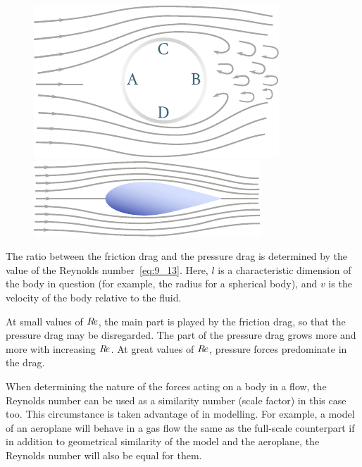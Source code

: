 \begin{figure}[t]
	\begin{minipage}[t]{0.5\linewidth}
		\begin{center}
			\includegraphics[scale=1.0]{figures/ch_09/fig_9_16.pdf}
			\caption[]{}
			\label{fig:9_16}
		\end{center}
	\end{minipage}
	\hspace{-0.0cm}
	\begin{minipage}[t]{0.5\linewidth}
		\begin{center}
			\includegraphics[scale=1.0]{figures/ch_09/fig_9_17.pdf}
			\caption[]{}
			\label{fig:9_17}
		\end{center}
	\end{minipage}
	\vspace{-0.5cm}
\end{figure}

The ratio between the friction drag and the pressure drag is determined by the value of the Reynolds number~\eqref{eq:9_13}. Here, $l$ is a characteristic dimension of the body in question (for example, the radius for a spherical body), and $v$ is the velocity of the body relative to the fluid.

At small values of $R\hspace{-1pt}e$, the main part is played by the friction drag, so that the pressure drag may be disregarded. The part of the pressure drag grows more and more with increasing $R\hspace{-1pt}e$. At great values of $R\hspace{-1pt}e$, pressure forces predominate in the drag.

When determining the nature of the forces acting on a body in a flow, the Reynolds number can be used as a similarity number (scale factor) in this case too. This circumstance is taken advantage of in modelling. For example, a model of an aeroplane will behave in a gas flow the same as the full-scale counterpart if in addition to geometrical similarity of the model and the aeroplane, the Reynolds number will also be equal for them.

